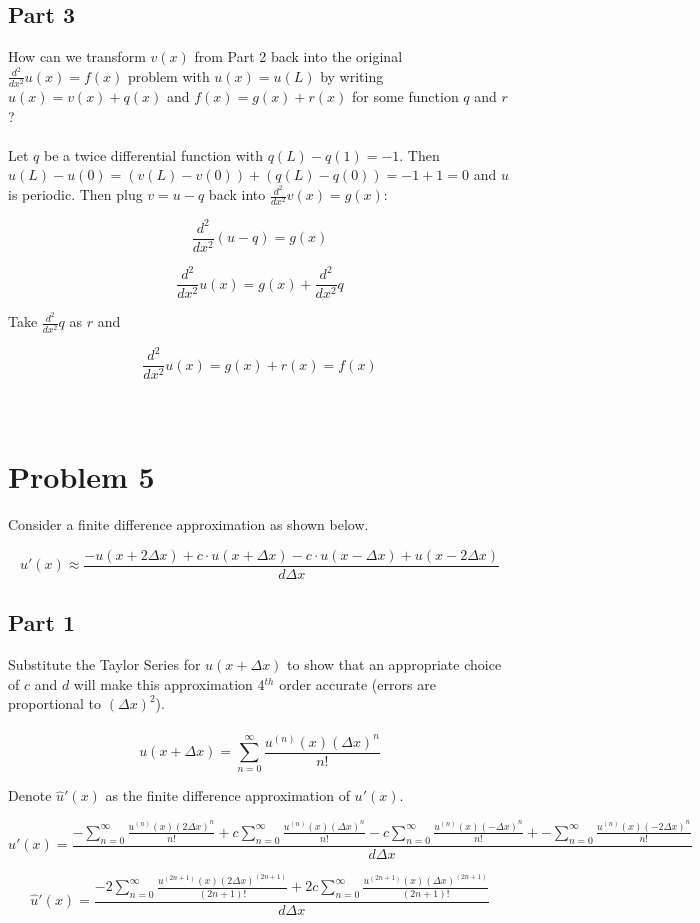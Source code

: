 \documentclass{amsart}
\begin{document}
	\subsection{Part 3}
	How can we transform $v(x)$ from Part 2 back into the original $\frac{d^2}{dx^2}u(x) = f(x)$ problem with $u(x) = u(L)$ by writing $u(x)=v(x)+q(x)$ and $f(x)=g(x)+r(x)$ for some function $q$ and $r$?
	\\\\
	\noindent
	Let $q$ be a twice differential function with $q(L)-q(1)=-1$. Then $u(L) - u(0) = (v(L)-v(0))+(q(L)-q(0)) = -1 + 1 = 0$ and $u$ is periodic. Then plug $v = u-q$ back into $\frac{d^2}{dx^2}v(x) = g(x)$:
	
	\[\frac{d^2}{dx^2}(u-q) = g(x)\]
	
	\[ \frac{d^2}{dx^2}u(x) = g(x) + \frac{d^2}{dx^2}q \]
	
	Take $\frac{d^2}{dx^2}q$ as $r$ and
	
	\[ \frac{d^2}{dx^2}u(x) = g(x) + r(x) = f(x)\]
	\\\\
	\section{Problem 5}
	Consider a finite difference approximation as shown below.
	
	\[ u'(x) \approx \frac{-u(x+2\Delta x) + c\cdot u(x+\Delta x) - c\cdot u(x - \Delta x) + u(x - 2\Delta x)}{d\Delta x} \]
	
	\subsection{Part 1}
	Substitute the Taylor Series for $u(x+\Delta x)$ to show that an appropriate choice of $c$ and $d$ will make this approximation 4$^{th}$ order accurate (errors are proportional to $(\Delta x)^2$).
	\\\\
	\[ u(x + \Delta x) = \sum_{n=0}^{\infty}\frac{u^{(n)}(x)(\Delta x)^n}{n!}\]
	
	Denote $\hat{u}'(x)$ as the finite difference approximation of $u'(x)$.
	
	\[ \hat{u}'(x) = \frac{ -\sum_{n=0}^{\infty}\frac{u^{(n)}(x)(2\Delta x)^n}{n!}+
	c\sum_{n=0}^{\infty}\frac{u^{(n)}(x)(\Delta x)^n}{n!}-
	c\sum_{n=0}^{\infty}\frac{u^{(n)}(x)(-\Delta x)^n}{n!}+
	-\sum_{n=0}^{\infty}\frac{u^{(n)}(x)(-2\Delta x)^n}{n!}  }{d\Delta x}\]
	
	\[ \hat{u}'(x) = \frac{
	-2\sum_{n=0}^{\infty}\frac{u^{(2n+1)}(x)(2\Delta x)^{(2n+1)}}{(2n+1)!}+
	2c\sum_{n=0}^{\infty}\frac{u^{(2n+1)}(x)(\Delta x)^{(2n+1)}}{(2n+1)!}
    }{d\Delta x}\]
    
\end{document}
